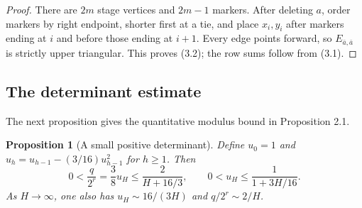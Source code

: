 \documentclass[reqno]{amsart}
\newtheorem{proposition}[theorem]{Proposition}
\theoremstyle{remark}
\numberwithin{equation}{section}
\begin{document}
\begin{proof}
There are $2m$ stage vertices and $2m-1$ markers.  After deleting $a$, order markers by right
endpoint, shorter first at a tie, and place $x_i,y_i$ after markers ending at $i$ and before those
ending at $i+1$.  Every edge points forward, so $E_{\bar a,\bar a}$ is strictly upper triangular.
This proves (3.2); the row sums follow from (3.1).
\end{proof}

\subsection{The determinant estimate}

The next proposition gives the quantitative modulus bound in Proposition 2.1.

\begin{proposition}[A small positive determinant]
Define $u_0=1$ and $u_h=u_{h-1}-(3/16)u_{h-1}^2$ for $h\geq 1$.  Then
\[
0<\frac{q}{2^r}=\frac{3}{8}u_H\leq\frac{2}{H+16/3},
\qquad 0<u_H\leq\frac{1}{1+3H/16}.
\]
As $H\to\infty$, one also has $u_H\sim 16/(3H)$ and $q/2^r\sim 2/H$.
\end{proposition}
\end{document}
